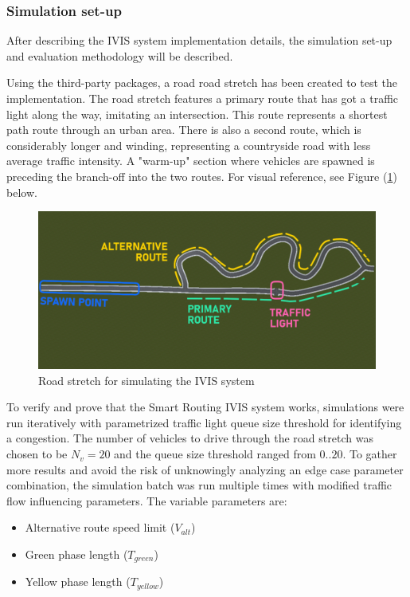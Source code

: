 \documentclass[main.tex]{subfiles}
\begin{document}
\subsubsection{Simulation set-up}

After describing the IVIS system implementation details, the simulation set-up and evaluation 
methodology will be described. 

Using the third-party packages, a road road stretch has been created to test the implementation.
The road stretch features a primary route that has got a traffic light along the way, imitating 
an intersection. This route represents a shortest path route through an urban area. 
There is also a second route, which is considerably longer and winding, representing a countryside 
road with less average traffic intensity. A "warm-up" section where vehicles are spawned is
preceding the branch-off into the two routes. For visual reference, see Figure
(\ref{fig-routeMap}) below.

\begin{figure}[htbp]
    \centering
    \includegraphics[width=.9\textwidth]{test-route-map-legend.png}
    \caption{Road stretch for simulating the IVIS system}
    \label{fig-routeMap}
\end{figure}

To verify and prove that the Smart Routing IVIS system works, simulations were run iteratively with 
parametrized traffic light queue size threshold for identifying a congestion. The number 
of vehicles to drive through the road stretch was chosen to be $N_{v} = 20 $ and the queue size 
threshold ranged from $0..20$. To gather more results 
and avoid the risk of unknowingly analyzing an edge case parameter combination, the simulation batch 
was run multiple times with modified traffic flow influencing parameters. The variable parameters are:

\begin{itemize}
    \item Alternative route speed limit ($V_{alt}$)
    \item Green phase length ($T_{green}$)
    \item Yellow phase length ($T_{yellow}$)
\end{itemize}
\end{document}
